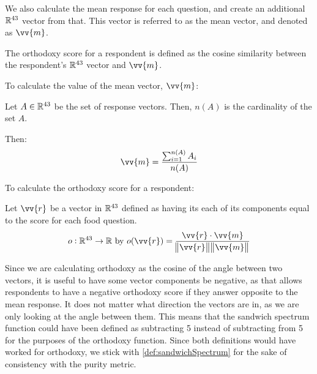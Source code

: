 We also calculate the mean response for each question, and create an additional $\mathbb{R}^{43}$ vector from that.
This vector is referred to as the mean vector, and denoted as $\vv{m}$.

The orthodoxy score for a respondent is defined as the cosine similarity between the respondent's $\mathbb{R}^{43}$ vector and $\vv{m}$.

\begin{definition}
	To calculate the value of the mean vector, $\vv{m}$:

	Let $A \in \mathbb{R}^{43}$ be the set of response vectors.
	Then, $n(A)$ is the cardinality of the set $A$.

	Then:
	\begin{equation}
		\vv{m} = \frac{\sum_{i = 1}^{n(A)} A_i}{n(A)}
	\end{equation}
\end{definition}

\begin{definition}
	To calculate the orthodoxy score for a respondent:

	Let $\vv{r}$ be a vector in $\mathbb{R}^{43}$ defined as having its each of its components equal to the score for each food question.
	\begin{equation}
		o \from \real^{43} \to \real\ \text{by}\ o(\vv{r}) = \frac{\vv{r} \cdot \vv{m}}{\norm{\vv{r}} \norm{\vv{m}}}
	\end{equation}
\end{definition}

Since we are calculating orthodoxy as the cosine of the angle between two vectors, it is useful to have some vector components be negative, as that allows respondents to have a negative orthodoxy score if they answer opposite to the mean response.
It does not matter what direction the vectors are in, as we are only looking at the angle between them.
This means that the sandwich spectrum function could have been defined as subtracting 5 instead of subtracting from 5 for the purposes of the orthodoxy function.
Since both definitions would have worked for orthodoxy, we stick with \cref{def:sandwichSpectrum} for the sake of consistency with the purity metric.

